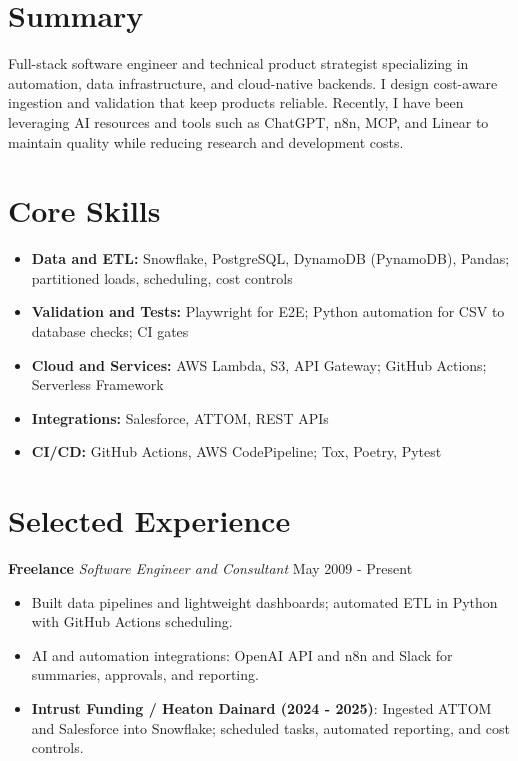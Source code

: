 \documentclass[10pt]{article}
\begin{document}
\section*{Summary}
Full-stack software engineer and technical product strategist specializing in automation, data infrastructure, and cloud-native backends. I design cost-aware ingestion and validation that keep products reliable. Recently, I have been leveraging AI resources and tools such as ChatGPT, n8n, MCP, and Linear to maintain quality while reducing research and development costs.

\section*{Core Skills}
\begin{itemize}[leftmargin=*]
  \item \textbf{Data and ETL:} Snowflake, PostgreSQL, DynamoDB (PynamoDB), Pandas; partitioned loads, scheduling, cost controls
  \item \textbf{Validation and Tests:} Playwright for E2E; Python automation for CSV to database checks; CI gates
  \item \textbf{Cloud and Services:} AWS Lambda, S3, API Gateway; GitHub Actions; Serverless Framework
  \item \textbf{Integrations:} Salesforce, ATTOM, REST APIs
  \item \textbf{CI/CD:} GitHub Actions, AWS CodePipeline; Tox, Poetry, Pytest
\end{itemize}

\section*{Selected Experience}
\noindent\textbf{Freelance} \textit{Software Engineer and Consultant} \hfill May 2009 - Present\par
\begin{itemize}
  \item Built data pipelines and lightweight dashboards; automated ETL in Python with GitHub Actions scheduling.
  \item AI and automation integrations: OpenAI API and n8n and Slack for summaries, approvals, and reporting.
  \item \textbf{Intrust Funding / Heaton Dainard (2024 - 2025)}: Ingested ATTOM and Salesforce into Snowflake; scheduled tasks, automated reporting, and cost controls.
\end{itemize}
\end{document}
